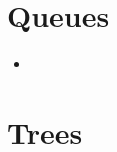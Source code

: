 \documentclass{article}
\begin{document}
\section{Queues}
\begin{itemize}
    \item 
\end{itemize}

\section{Trees}
\end{document}
